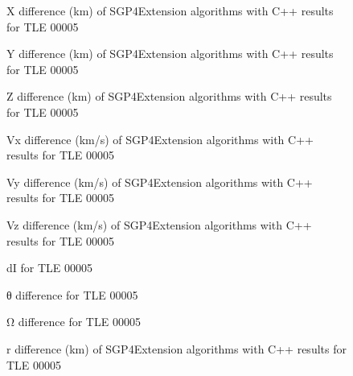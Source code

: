 \documentclass{article}
\begin{document}
\begin{figure}
    
    \caption{X difference (km) of SGP4Extension algorithms with C++ results for TLE 00005}
    \label{fig:dx}
\end{figure}

\begin{figure}
    
    \caption{Y difference (km) of SGP4Extension algorithms with C++ results for TLE 00005}
    \label{fig:dy}
\end{figure}

\begin{figure}
    
    \caption{Z difference (km) of SGP4Extension algorithms with C++ results for TLE 00005}
    \label{fig:dz}
\end{figure}

\begin{figure}
    
    \caption{Vx difference (km/s) of SGP4Extension algorithms with C++ results for TLE 00005}
    \label{fig:dvx}
\end{figure}

\begin{figure}
    
    \caption{Vy difference (km/s) of SGP4Extension algorithms with C++ results for TLE 00005}
    \label{fig:dvy}
\end{figure}

\begin{figure}
    
    \caption{Vz difference (km/s) of SGP4Extension algorithms with C++ results for TLE 00005}
    \label{fig:dvz}
\end{figure}

\begin{figure}
    
    \caption{dI for TLE 00005}
    \label{fig:dx}
\end{figure}

\begin{figure}
    
    \caption{θ difference for TLE 00005}
    \label{fig:dy}
\end{figure}

\begin{figure}
    
    \caption{Ω difference for TLE 00005}
    \label{fig:dz}
\end{figure}

\begin{figure}
    
    \caption{r difference (km) of SGP4Extension algorithms with C++ results for TLE 00005}
    \label{fig:dvx}
\end{figure}
\end{document}
